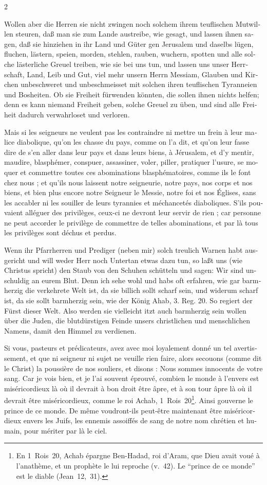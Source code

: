 \documentclass[a4paper,12pt]{article}
\newcommand\chunks[2]{%
\begin{leftcolumn*}\begin{otherlanguage}{german}%
{#1}%
\end{otherlanguage}\end{leftcolumn*}%
\begin{rightcolumn}\begin{otherlanguage}{french}%
{#2}%
\end{otherlanguage}\end{rightcolumn}%
}
\begin{document}
\begin{paracol}{2}
  \chunks{Wollen aber die Herren sie nicht zwingen noch solchem ihrem teuflischen Mutwillen steuren, daß man sie zum Lande austreibe, wie gesagt, und lassen ihnen sagen, daß sie hinziehen in ihr Land und Güter gen Jerusalem und daselbs lügen, fluchen, lästern, speien, morden, stehlen, rauben, wuchern, spotten und alle solche lästerliche Greuel treiben, wie sie bei uns tun, und lassen uns unser Herrschaft, Land, Leib und Gut, viel mehr unsern Herrn Messiam, Glauben und Kirchen unbeschweret und unbeschmeisset mit solchen ihren teuflischen Tyranneien und Bosheiten. Ob sie Freiheit fürwenden könnten, die sollen ihnen nichts helfen; denn es kann niemand Freiheit geben, solche Greuel zu üben, und sind alle Freiheit dadurch verwahrloset und verloren.}
         {Mais si les seigneurs ne veulent pas les contraindre ni mettre un frein à leur malice diabolique, qu’on les chasse du pays, comme on l’a dit, et qu’on leur fasse dire de s’en aller dans leur pays et dans leurs biens, à Jérusalem, et d’y mentir, maudire, blasphémer, conspuer, assassiner, voler, piller, pratiquer l’usure, se moquer et commettre toutes ces abominations blasphématoires, comme ils le font chez nous ; et qu’ils nous laissent notre seigneurie, notre pays, nos corps et nos biens, et bien plus encore notre Seigneur le Messie, notre foi et nos Églises, sans les accabler ni les souiller de leurs tyrannies et méchancetés diaboliques. S’ils pouvaient alléguer des privilèges, ceux-ci ne devront leur servir de rien ; car personne ne peut accorder le privilège de commettre de telles abominations, et par là tous les privilèges sont déchus et perdus.}
  \chunks{Wenn ihr Pfarrherren und Prediger (neben mir) solch treulich Warnen habt ausgericht und will weder Herr noch Untertan etwas dazu tun, so laßt uns (wie Christus spricht) den Staub von den Schuhen schütteln und sagen: Wir sind unschuldig an eurem Blut. Denn ich sehe wohl und habs oft erfahren, wie gar barmherzig die verkehrete Welt ist, da sie billich sollt scharf sein, und widerum scharf ist, da sie sollt barmherzig sein, wie der König Ahab, 3. Reg. 20. So regiert der Fürst dieser Welt. Also werden sie vielleicht itzt auch barmherzig sein wollen über die Juden, die blutdürstigen Feinde unsers christlichen und menschlichen Namens, damit den Himmel zu verdienen.}
         {Si vous, pasteurs et prédicateurs, avez avec moi loyalement donné un tel avertissement, et que ni seigneur ni sujet ne veuille rien faire, alors secouons (comme dit le Christ) la poussière de nos souliers, et disons : Nous sommes innocents de votre sang. Car je vois bien, et je l’ai souvent éprouvé, combien le monde à l’envers est miséricordieux là où il devrait à bon droit être âpre, et à son tour âpre là où il devrait être miséricordieux, comme le roi Achab, 1~Rois~20\footnote{En 1~Rois~20, Achab épargne Ben-Hadad, roi d’Aram, que Dieu avait voué à l’anathème, et un prophète le lui reproche (v.~42). Le \enquote{prince de ce monde} est le diable (Jean~12,~31).}. Ainsi gouverne le prince de ce monde. De même voudront-ils peut-être maintenant être miséricordieux envers les Juifs, les ennemis assoiffés de sang de notre nom chrétien et humain, pour mériter par là le ciel.}

\end{paracol}
\end{document}
